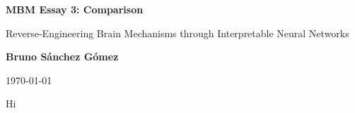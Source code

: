 \documentclass[11pt,a4paper]{article}
\author{Bruno Sánchez Gómez}
\date{\today}
\begin{document}
\begin{titlepage}
    \centering
    \vspace*{2cm}
    {\Huge \bfseries MBM Essay 3: Comparison \par}
    \vspace{2cm}
    {\Large {\Huge Reverse-Engineering Brain Mechanisms through Interpretable Neural Networks} \par}
    \vspace{8cm}
    {\large \textbf{Bruno Sánchez Gómez} \par}
    \vfill
    {\large \today \par}
\end{titlepage}

Hi

\clearpage
\nocite{*}
\printbibliography%
\end{document}
